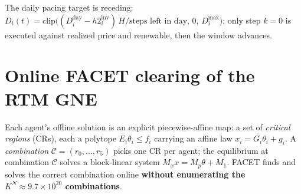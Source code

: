 \documentclass[11pt, letterpaper]{article}
\begin{document}
The daily pacing target is receding: $D_i(t)=\text{clip}\big((D^{\mathrm{day}}_i-h2^{\mathrm{inv}}_i)\,
H/\text{steps left in day},\,0,\,D^{\max}_i\big)$; only step $k=0$ is executed against realized price
and renewable, then the window advances.

\section{Online FACET clearing of the RTM GNE}\label{sec:facet}
Each agent's offline solution is an explicit piecewise-affine map: a set of \emph{critical regions}
(CRs), each a polytope $E_i\theta_i\le f_i$ carrying an affine law $x_i=G_i\theta_i+g_i$. A
\emph{combination} $\mathcal C=(r_0,\dots,r_5)$ picks one CR per agent; the equilibrium at combination
$\mathcal C$ solves a block-linear system $M_x x = M_p\theta+M_1$. FACET finds and solves the correct
combination online \textbf{without enumerating the $K^N\!\approx\!9.7\times10^{20}$ combinations}.
\end{document}
